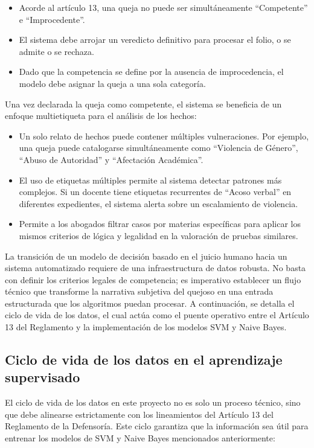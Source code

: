 \begin{itemize}
\item Acorde al artículo 13, una queja no puede ser simultáneamente “Competente” e “Improcedente”.
\item El sistema debe arrojar un veredicto definitivo para procesar el folio, o se admite o se rechaza.
\item Dado que la competencia se define por la ausencia de improcedencia, el modelo debe asignar la queja a una sola categoría.
\end{itemize}

Una vez declarada la queja como competente, el sistema se beneficia de un enfoque multietiqueta para el análisis de los hechos:
\begin{itemize}
\item Un solo relato de hechos puede contener múltiples vulneraciones. Por ejemplo, una queja puede catalogarse simultáneamente como “Violencia de Género”, “Abuso de Autoridad” y “Afectación Académica”.
\item El uso de etiquetas múltiples permite al sistema detectar patrones más complejos. Si un docente tiene etiquetas recurrentes de “Acoso verbal” en diferentes expedientes, el sistema alerta sobre un escalamiento de violencia.
\item Permite a los abogados filtrar casos por materias específicas para aplicar los mismos criterios de lógica y legalidad en la valoración de pruebas similares.
\end{itemize}

La transición de un modelo de decisión basado en el juicio humano hacia un sistema automatizado requiere de una infraestructura de datos robusta. No basta con definir los criterios legales de competencia; es imperativo establecer un flujo técnico que transforme la narrativa subjetiva del quejoso en una entrada estructurada que los algoritmos puedan procesar. A continuación, se detalla el ciclo de vida de los datos, el cual actúa como el puente operativo entre el Artículo 13 del Reglamento y la implementación de los modelos SVM y Naive Bayes.

\subsection{Ciclo de vida de los datos en el aprendizaje supervisado}

El ciclo de vida de los datos en este proyecto no es solo un proceso técnico, sino que debe alinearse estrictamente con los lineamientos del Artículo 13 del Reglamento de la Defensoría. Este ciclo garantiza que la información sea útil para entrenar los modelos de SVM y Naive Bayes mencionados anteriormente:

